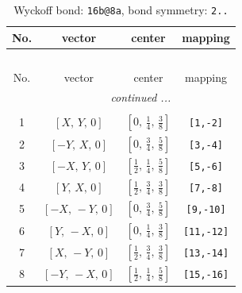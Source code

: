 \documentclass[fleqn,8pt]{jsarticle}
\begin{document}
\begin{longtable}{cccc}
\caption{Wyckoff bond: {\tt 16b@8a}, bond symmetry: {\tt 2..}}
 \\
 \hline \hline
No. & vector & center & mapping \\ \hline \endfirsthead

\multicolumn{3}{l}{\tablename\ \thetable{}} \\
 \hline \hline
No. & vector & center & mapping \\ \hline \endhead

 \hline \hline
\multicolumn{3}{r}{\footnotesize\it continued ...} \\ \endfoot

 \hline \hline
\multicolumn{3}{r}{} \\ \endlastfoot

1 & $\left[ X,\, Y,\, 0 \right]$ & $\left[ 0,\, \frac{1}{4},\, \frac{3}{8} \right]$ & {\tt [1,-2]} \\ \hline
2 & $\left[ - Y,\, X,\, 0 \right]$ & $\left[ 0,\, \frac{3}{4},\, \frac{5}{8} \right]$ & {\tt [3,-4]} \\ \hline
3 & $\left[ - X,\, Y,\, 0 \right]$ & $\left[ \frac{1}{2},\, \frac{1}{4},\, \frac{5}{8} \right]$ & {\tt [5,-6]} \\ \hline
4 & $\left[ Y,\, X,\, 0 \right]$ & $\left[ \frac{1}{2},\, \frac{3}{4},\, \frac{3}{8} \right]$ & {\tt [7,-8]} \\ \hline
5 & $\left[ - X,\, - Y,\, 0 \right]$ & $\left[ 0,\, \frac{3}{4},\, \frac{5}{8} \right]$ & {\tt [9,-10]} \\ \hline
6 & $\left[ Y,\, - X,\, 0 \right]$ & $\left[ 0,\, \frac{1}{4},\, \frac{3}{8} \right]$ & {\tt [11,-12]} \\ \hline
7 & $\left[ X,\, - Y,\, 0 \right]$ & $\left[ \frac{1}{2},\, \frac{3}{4},\, \frac{3}{8} \right]$ & {\tt [13,-14]} \\ \hline
8 & $\left[ - Y,\, - X,\, 0 \right]$ & $\left[ \frac{1}{2},\, \frac{1}{4},\, \frac{5}{8} \right]$ & {\tt [15,-16]} \\
\end{longtable}
\renewcommand{\arraystretch}{1.2}
\end{document}

